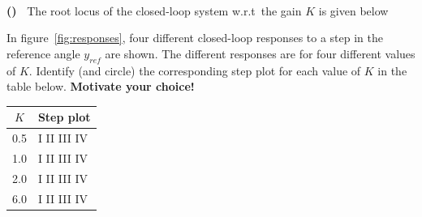\documentclass[letterpaper,12pt]{scrartcl}
\newenvironment{exercise}[1][Problem]{\begin{trivlist} \item[\hskip
    \labelsep {\stepcounter{exerctr}\bfseries #1
      \arabic{exerctr}}]}{\end{trivlist}\vspace{10mm}}
\newcounter{exerctr}
\newcounter{abcctr}[exerctr]
\newcommand{\abc}{\noindent\vspace{1mm}\\ {\bf
    \stepcounter{abcctr}(\alph{abcctr})\ }}
\begin{document}
\begin{exercise}
\abc%
The root locus of the closed-loop system w.r.t~the gain $K$ is given below
\begin{center}
\end{center}
In figure~\ref{fig:responses}, four different closed-loop responses to a step in the reference angle $y_{ref}$ are shown. The different responses are for four different values of $K$. Identify (and circle) the corresponding step plot for each value of $K$ in the table below. \textbf{Motivate your choice!}
\begin{center}
\begin{tabular}{cl}
\(K\) & Step plot\\\hline
0.5 & I\hspace*{2mm} II\hspace*{2mm} III\hspace*{2mm} IV\\[1mm]
1.0 & I\hspace*{2mm} II\hspace*{2mm} III\hspace*{2mm} IV\\[1mm]
2.0 & I\hspace*{2mm} II\hspace*{2mm} III\hspace*{2mm} IV\\[1mm]
6.0 & I\hspace*{2mm} II\hspace*{2mm} III\hspace*{2mm} IV\\ \hline
\end{tabular}
\end{center}



\end{exercise}
\end{document}
